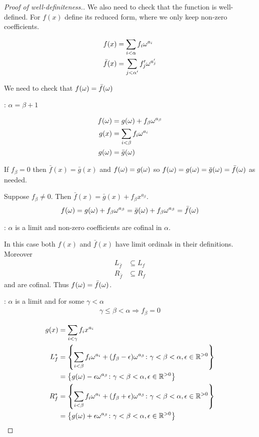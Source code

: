 \begin{proof}[Proof of well-definiteness.] %

We also need to check that the function is well-defined. For $f(x)$ define its reduced form, where we only keep non-zero coefficients.

\begin{align*}
	f(x) &= \sum_{i < \alpha} f_i \omega^{a_i} \\
	\bar f(x) &= \sum_{j < \alpha'} f_j' \omega^{a_j'}
\end{align*}

We need to check that $f(\omega) = \bar f(\omega)$

: $\alpha = \beta + 1$

\begin{align*}
	f(\omega) &= g(\omega) + f_\beta \omega^{a_\beta} \\
	g(x) &= \sum_{i < \beta} f_i \omega^{a_i} \\
	g(\omega) &= \bar g(\omega)
\end{align*}

If $f_\beta = 0$ then $\bar f(x) = \bar g(x)$ and $f(\omega) = g(\omega)$ so $f(\omega) = g(\omega) = \bar g(\omega) = \bar f(\omega)$ as needed.

Suppose $f_\beta \neq 0$. Then $\bar f(x) = \bar g(x) + f_\beta x^{a_\beta}$.
\begin{align*}
	f(\omega) = g(\omega) + f_\beta \omega^{a_\beta} = \bar g(\omega) + f_\beta \omega^{a_\beta} = \bar f(\omega)
\end{align*}

: $\alpha$ is a limit and non-zero coefficients are cofinal in $\alpha$.

In this case both $f(x)$ and $\bar f(x)$ have limit ordinals in their definitions. Moreover 
\begin{align*}
	L_{\bar f} &\subseteq L_f \\
	R_{\bar f} &\subseteq R_f
\end{align*}
and are cofinal. Thus $f(\omega) = \bar f(\omega)$.

: $\alpha$ is a limit and for some $\gamma < \alpha$
\begin{align*}
	\gamma \leq \beta < \alpha \Rightarrow f_\beta = 0
\end{align*}

\begin{align*}
	g(x) &= \sum_{i < \gamma} f_i x^{a_i} \\
  L_f^* &= \left\{ \sum_{i < \beta} f_i \omega^{a_i} + (f_\beta - \epsilon) \omega^{a_\beta}
	\colon \gamma < \beta < \alpha, \epsilon \in \mathbb{R}^{>0} \right\} \\
	&= \left\{ g(\omega) - \epsilon \omega^{a_\beta}
	\colon \gamma < \beta < \alpha, \epsilon \in \mathbb{R}^{>0} \right\} \\
  R_f^* &= \left\{ \sum_{i < \beta} f_i \omega^{a_i} + (f_\beta + \epsilon) \omega^{a_\beta}
	\colon \gamma < \beta < \alpha, \epsilon \in \mathbb{R}^{>0} \right\} \\
	&= \left\{ g(\omega) + \epsilon \omega^{a_\beta}
	\colon \gamma < \beta < \alpha, \epsilon \in \mathbb{R}^{>0} \right\}
\end{align*}


\end{proof}

